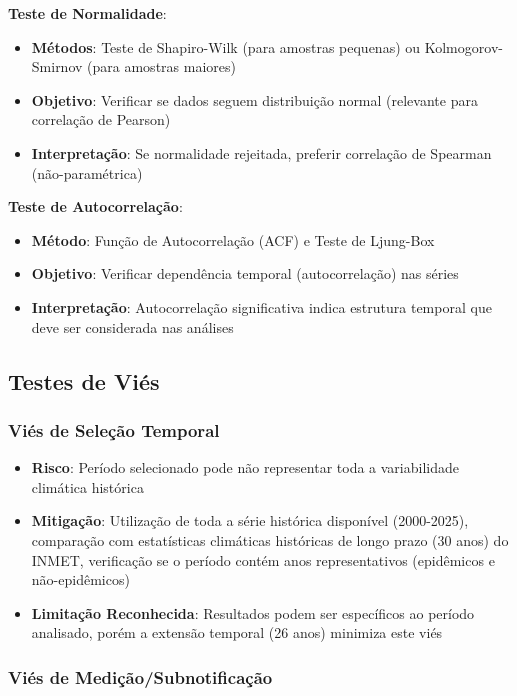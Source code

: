 \textbf{Teste de Normalidade}:
\begin{itemize}
    \item \textbf{Métodos}: Teste de Shapiro-Wilk (para amostras pequenas) ou Kolmogorov-Smirnov (para amostras maiores)
    \item \textbf{Objetivo}: Verificar se dados seguem distribuição normal (relevante para correlação de Pearson)
    \item \textbf{Interpretação}: Se normalidade rejeitada, preferir correlação de Spearman (não-paramétrica)
\end{itemize}

\textbf{Teste de Autocorrelação}:
\begin{itemize}
    \item \textbf{Método}: Função de Autocorrelação (ACF) e Teste de Ljung-Box
    \item \textbf{Objetivo}: Verificar dependência temporal (autocorrelação) nas séries
    \item \textbf{Interpretação}: Autocorrelação significativa indica estrutura temporal que deve ser considerada nas análises
\end{itemize}

\subsection{Testes de Viés}

\subsubsection{Viés de Seleção Temporal}

\begin{itemize}
    \item \textbf{Risco}: Período selecionado pode não representar toda a variabilidade climática histórica
    \item \textbf{Mitigação}: Utilização de toda a série histórica disponível (2000-2025), comparação com estatísticas climáticas históricas de longo prazo (30 anos) do INMET, verificação se o período contém anos representativos (epidêmicos e não-epidêmicos)
    \item \textbf{Limitação Reconhecida}: Resultados podem ser específicos ao período analisado, porém a extensão temporal (26 anos) minimiza este viés
\end{itemize}

\subsubsection{Viés de Medição/Subnotificação}

